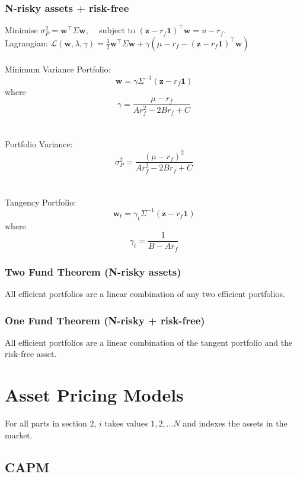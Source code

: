 \documentclass[11pt]{article}
\begin{document}
	\subsubsection{N-risky assets + risk-free}
	Minimise \( \sigma_P^2 = \bm{w}^{\top} \Sigma \bm{w} \), \( \quad \)subject to \( (\bm{z} - r_{f}\bm{1})^{\top}\bm{w} = u - r_f \).\\[5pt]
	Lagrangian: \( \mathcal{L}(\bm{w}, \lambda, \gamma)  = \frac{1}{2}\bm{w}^{\top}\Sigma\bm{w} + \gamma(\mu - r_f - (\bm{z} - r_f \bm{1})^{\top}\bm{w}) \)\\\\
	Minimum Variance Portfolio: \[ \bm{w} = \gamma\Sigma^{-1}(\bm{z} - r_f \bm{1}) \] where \[ \gamma = \frac{\mu - r_f}{A r_f^2 -2B r_f + C} \]\\\\
	Portfolio Variance: \[ \sigma_P^2 = \frac{(\mu - r_f)^2}{A r_f^2 -2B r_f + C} \]\\\\
	Tangency Portfolio: \[ \bm{w}_t = \gamma_t \Sigma^{-1}(\bm{z} - r_f \bm{1}) \] where \[ \gamma_t = \frac{1}{B - Ar_f} \]
	\newpage
	\subsubsection{Two Fund Theorem (N-risky assets)}
	All efficient portfolios are a linear combination of any two efficient portfolios. 
	\subsubsection{One Fund Theorem (N-risky + risk-free)}
	All efficient portfolios are a linear combination of the tangent portfolio and the risk-free asset.
	
	\newpage
	\section{Asset Pricing Models}
	For all parts in section 2, \( i \) takes values \( 1,2,... N \) and indexes the assets in the market.
	\subsection{CAPM}
\end{document}

